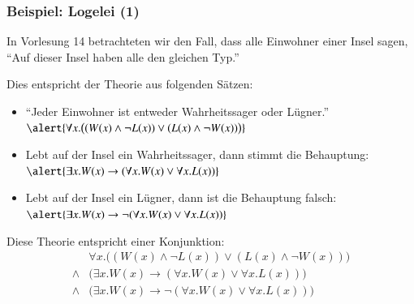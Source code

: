 \documentclass[onlymath]{beamer}
\begin{document}
\begin{frame}\frametitle{Beispiel: Logelei (1)}

In Vorlesung 14 betrachteten wir den Fall, dass alle Einwohner einer Insel sagen,
"`Auf dieser Insel haben alle den gleichen Typ."'\bigskip

Dies entspricht der Theorie aus folgenden Sätzen:
\begin{itemize}
\item "`Jeder Einwohner ist entweder Wahrheitssager oder Lügner."'\\
	$\alert{\forall x.\big((W(x)\wedge\neg L(x))\vee (L(x)\wedge\neg W(x))\big)}$
\item Lebt auf der Insel ein Wahrheitssager, dann stimmt die Behauptung:\\
	$\alert{\exists x.W(x)\to(\forall x.W(x) \vee \forall x.L(x))}$
\item Lebt auf der Insel ein Lügner, dann ist die Behauptung falsch:\\
	$\alert{\exists x.W(x)\to\neg(\forall x.W(x) \vee \forall x.L(x))}$
\end{itemize}

Diese Theorie entspricht einer Konjunktion:
\begin{align*}
& \forall x.\big((W(x)\wedge\neg L(x))\vee (L(x)\wedge\neg W(x))\big)\\
{}\wedge{} & \big(\exists x.W(x)\to(\forall x.W(x) \vee \forall x.L(x))\big) \\
{}\wedge{} & \big(\exists x.W(x)\to\neg(\forall x.W(x) \vee \forall x.L(x))\big)
\end{align*}


\end{frame}
\end{document}
